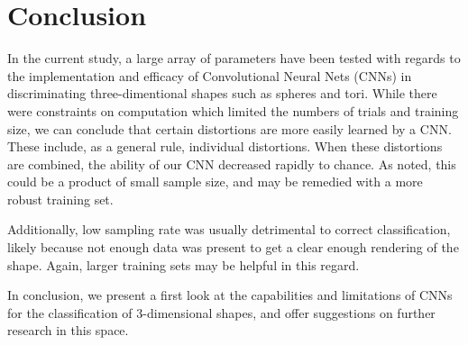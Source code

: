 \documentclass{article}
\begin{document}
\section{Conclusion}

In the current study, a large array of parameters have been tested with regards to the implementation and
efficacy of Convolutional Neural Nets (CNNs) in discriminating three-dimentional shapes such as spheres and
tori. While there were constraints on computation which limited the numbers of trials and training size,
we can conclude that certain distortions are more easily learned by a CNN. These include, as a general rule,
individual distortions. When these distortions are combined, the ability of our CNN decreased rapidly to chance.
As noted, this could be a product of small sample size, and may be remedied with a more robust training set.

Additionally, low sampling rate was usually detrimental to correct classification, likely because not enough
data was present to get a clear enough rendering of the shape. Again, larger training sets may be helpful in this
regard.

In conclusion, we present a first look at the capabilities and limitations of CNNs for the classification of 3-dimensional
shapes, and offer suggestions on further research in this space.




\end{document}
